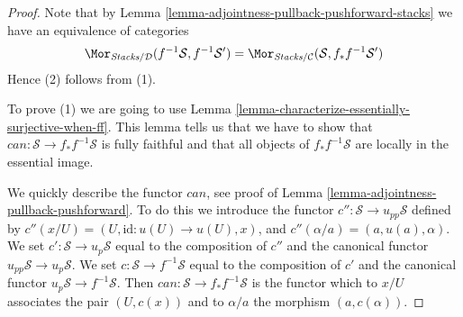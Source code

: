 \begin{proof}
Note that by
Lemma \ref{lemma-adjointness-pullback-pushforward-stacks}
we have an equivalence of categories
$$
\Mor_{\textit{Stacks}/\mathcal{D}}(f^{-1}\mathcal{S}, f^{-1}\mathcal{S}')
=
\Mor_{\textit{Stacks}/\mathcal{C}}(\mathcal{S}, f_*f^{-1}\mathcal{S}')
$$
Hence (2) follows from (1).

\medskip\noindent
To prove (1) we are going to use
Lemma \ref{lemma-characterize-essentially-surjective-when-ff}.
This lemma tells us that we have to show that
$can : \mathcal{S} \to f_*f^{-1}\mathcal{S}$ is
fully faithful and that all objects of $f_*f^{-1}\mathcal{S}$
are locally in the essential image.

\medskip\noindent
We quickly describe the functor $can$, see proof of
Lemma \ref{lemma-adjointness-pullback-pushforward}.
To do this we introduce the functor
$c'' : \mathcal{S} \to u_{pp}\mathcal{S}$ defined by
$c''(x/U) = (U, \text{id} : u(U) \to u(U), x)$, and
$c''(\alpha/a) = (a, u(a), \alpha)$. We set
$c' : \mathcal{S} \to u_p\mathcal{S}$ equal to the composition
of $c''$ and the canonical functor $u_{pp}\mathcal{S} \to u_p\mathcal{S}$.
We set $c : \mathcal{S} \to f^{-1}\mathcal{S}$ equal to the composition
of $c'$ and the canonical functor $u_p\mathcal{S} \to f^{-1}\mathcal{S}$.
Then $can : \mathcal{S} \to f_*f^{-1}\mathcal{S}$ is the functor
which to $x/U$ associates the pair $(U, c(x))$ and to
$\alpha/a$ the morphism $(a, c(\alpha))$.


\end{proof}
